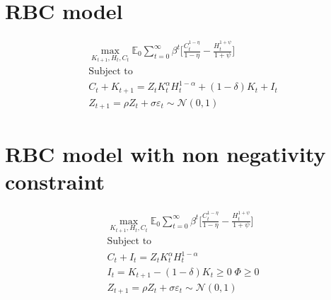 \documentclass{article}
\newcommand{\E}{\mathbb{E}}
\begin{document}
\thispagestyle{empty}
\section{RBC model}
\begin{gather*}
	\max_{K_{t+1},H_t,C_t} \E_0 \sum_{t=0}^\infty \beta^t\bigg[ \frac{C_{t}^{1-\eta}}{1-\eta} - \frac{H_t^{1+\psi}}{1+\psi}   \bigg]
	\\
	\text{Subject to}
	\\
	C_t + K_{t+1} = Z_t K_t^\alpha H_t^{1-\alpha} + (1-\delta)K_t + I_t
	\\
	Z_{t+1} = \rho Z_{t} + \sigma \varepsilon_t \sim \mathcal{N}(0,1)
\end{gather*}

\section{RBC model with non negativity constraint}
\begin{gather*}
	\max_{K_{t+1},H_t,C_t} \E_0 \sum_{t=0}^\infty \beta^t\bigg[ \frac{C_{t}^{1-\eta}}{1-\eta} - \frac{H_t^{1+\psi}}{1+\psi}   \bigg]
	\\
	\text{Subject to}
	\\
	C_t + I_t = Z_t K_t^\alpha H_t^{1-\alpha}
	\\
	I_t = K_{t+1} - (1-\delta)K_t \geq 0 \; \Phi \geq 0
	\\
	Z_{t+1} = \rho Z_{t} + \sigma \varepsilon_t \sim \mathcal{N}(0,1)
\end{gather*}
	
\end{document}
